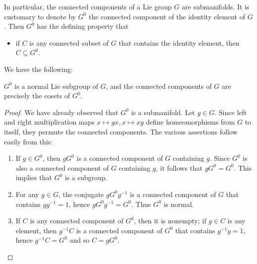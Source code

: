\documentclass[reqno]{amsart} 
\begin{document}
In particular, the connected components of a Lie group $G$ are 
submanifolds.  It is customary to denote by $G^0$ the connected
component of the identity element of $G$.  Then $G^0$ has the
defining property that
\begin{itemize}
\item if $C$ is any  connected subset of $G$
  that contains the identity element,
  then $C \subseteq G^0$.
\end{itemize}
We have the following:
\begin{theorem}
  $G^0$ is a normal Lie subgroup of $G$,
  and the connected components
  of $G$ are precisely the cosets of $G^0$.
\end{theorem}
\begin{proof}
  We have already observed that $G^0$ is a submanifold.  Let
  $g \in G$.  Since left and right multiplication maps
  $x \mapsto g x, x \mapsto x g$ define homeomorphisms from $G$
  to itself, they permute the connected components.  The various
  assertions follow easily from this:
  \begin{enumerate}
  \item If $g \in G^0$,
    then $g G^0$ is a connected component of $G$
    containing $g$.  Since $G^0$ is also a connected
    component of $G$ containing $g$, it follows that $g G^0 = G^0$.
    This implies that $G^0$ is a subgroup.
  \item For any $g \in G$,
    the conjugate $g G^0 g^{-1}$ is a connected component of $G$
    that contains $g g^{-1} = 1$, hence $g G^0 g^{-1} = G^0$.
    Thus $G^0$ is normal.
  \item If $C$ is any connected component of $G^0$,
    then it is nonempty;
    if $g \in C$ is any element,
    then $g^{-1} C$ is a connected component of $G^0$
    that contains $g^{-1} g = 1$,
    hence $g^{-1} C = G^0$ and so $C = g G^0$.
  \end{enumerate}
\end{proof}
\end{document}
